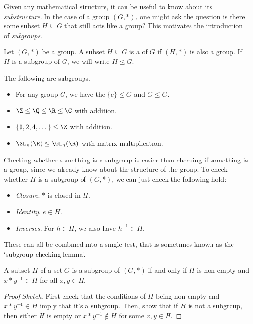 Given any mathematical structure, it can be useful to know about its \emph{substructure}. In the case of a group $(G, *)$, one might ask the question is there some subset $H \subseteq G$ that still acts like a group? This motivates the introduction of \emph{subgroups}.

\begin{definition}[Subgroups]
	Let $(G, *)$ be a group. A subset $H \subseteq G$ is a  of $G$ if $(H, *)$ is also a group. If $H$ is a subgroup of $G$, we will write $H \leq G$.
\end{definition}

\begin{example}
	The following are subgroups.
	\begin{itemize}
		\item For any group $G$, we have the  $\{ e \} \leq G$ and $G \leq G$.
		\item $\Z \leq \Q \leq \R \leq \C$ with addition.
		\item $\{ 0, 2, 4, \dots \} \leq \Z$ with addition.
		\item $\SL_n(\R) \leq \GL_n(\R)$ with matrix multiplication.
	\end{itemize}
\end{example}


Checking whether something is a subgroup is easier than checking if something is a group, since we already know about the structure of the group. To check whether $H$ is a subgroup of $(G, *)$, we can just check the following hold:
\begin{itemize}
	\item \emph{Closure}. $*$ is closed in $H$.
	\item \emph{Identity}. $e \in H$.
	\item \emph{Inverses}. For $h \in H$, we also have $h^{-1} \in H$. 
\end{itemize}

These can all be combined into a single test, that is sometimes known as the `subgroup checking lemma'.

\begin{lemma}
	A subset $H$ of a set $G$ is a subgroup of $(G, *)$ if and only if $H$ is non-empty and $x * y^{-1} \in H$ for all $x, y \in H$.
\end{lemma}
\begin{proof}[Proof Sketch]
	First check that the conditions of $H$ being non-empty and $x * y^{-1} \in H$ imply that it's a subgroup. Then, show that if $H$ is not a subgroup, then either $H$ is empty or $x * y^{-1} \not\in H$ for some $x, y \in H$.
\end{proof}

